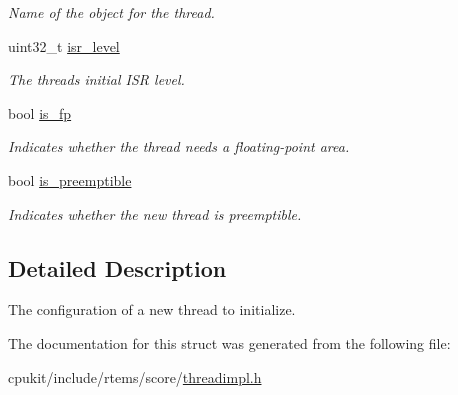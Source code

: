 \begin{DoxyCompactItemize}
\begin{DoxyCompactList}\small\item\em Name of the object for the thread. \end{DoxyCompactList}\item 
\mbox{\label{structThread__Configuration_acbff720c6afbdaaf87562dfc2224a677}} 
uint32\+\_\+t \mbox{\hyperlink{structThread__Configuration_acbff720c6afbdaaf87562dfc2224a677}{isr\+\_\+level}}
\begin{DoxyCompactList}\small\item\em The thread\textquotesingle{}s initial I\+SR level. \end{DoxyCompactList}\item 
\mbox{\label{structThread__Configuration_aee1eaa7846da823ebab0078f8c41c375}} 
bool \mbox{\hyperlink{structThread__Configuration_aee1eaa7846da823ebab0078f8c41c375}{is\+\_\+fp}}
\begin{DoxyCompactList}\small\item\em Indicates whether the thread needs a floating-\/point area. \end{DoxyCompactList}\item 
\mbox{\label{structThread__Configuration_a938507321c42bcdd719b08b84eadf0ad}} 
bool \mbox{\hyperlink{structThread__Configuration_a938507321c42bcdd719b08b84eadf0ad}{is\+\_\+preemptible}}
\begin{DoxyCompactList}\small\item\em Indicates whether the new thread is preemptible. \end{DoxyCompactList}\end{DoxyCompactItemize}


\subsection{Detailed Description}
The configuration of a new thread to initialize. 

The documentation for this struct was generated from the following file\+:\begin{DoxyCompactItemize}
\item 
cpukit/include/rtems/score/\mbox{\hyperlink{threadimpl_8h}{threadimpl.\+h}}\end{DoxyCompactItemize}
